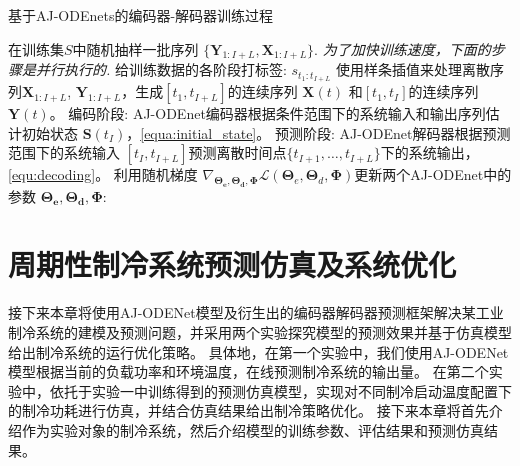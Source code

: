 \begin{algorithm*}[]
\caption{ 基于AJ-ODEnets的编码器-解码器训练过程 }
\label{alg:training}
\begin{algorithmic}[1]
\State  在训练集$S$中随机抽样一批序列 $\{\boldsymbol{Y}_{1:I+L}, {\boldsymbol {X}}_{1:I+L}\}$.
\State \text{//}\textit{为了加快训练速度，下面的步骤是并行执行的.}
\State 给训练数据的各阶段打标签: $s_{t_1:t_{I+L}}$
\State 使用样条插值来处理离散序列${\boldsymbol {X}}_{1:I+L}$, $\boldsymbol{Y}_{1:I+L}$，生成$[t_1, t_{I+L}]$的连续序列 $\boldsymbol X(t)$ 和$[t_1, t_{I}]$的连续序列 $\boldsymbol Y(t)$。
\State 编码阶段: AJ-ODEnet编码器根据条件范围下的系统输入和输出序列估计初始状态 $\boldsymbol{S}\left(t_{I}\right)$，\eqref{equa:initial_state}。
\State 预测阶段: AJ-ODEnet解码器根据预测范围下的系统输入 $[t_I, t_{I+L}]$预测离散时间点$\{t_{I+1}, \dots, t_{I+L}\}$下的系统输出，\eqref{equ:decoding}。
\State 利用随机梯度 $\nabla_{\boldsymbol{\Theta_{e}}, \boldsymbol{\Theta_{d}}, \boldsymbol \Phi}\mathcal{L}\left(\boldsymbol{\Theta}_{e}, \boldsymbol{\Theta}_{d}, \boldsymbol{\Phi}\right)$更新两个AJ-ODEnet中的参数 $\boldsymbol{\Theta_{e}}, \boldsymbol{\Theta_{d}}, \boldsymbol \Phi$:
\EndFor
\EndFor
\end{algorithmic}
\end{algorithm*}


\section{周期性制冷系统预测仿真及系统优化}
\label{sec:evalutaion}
接下来本章将使用AJ-ODENet模型及衍生出的编码器解码器预测框架解决某工业制冷系统的建模及预测问题，并采用两个实验探究模型的预测效果并基于仿真模型给出制冷系统的运行优化策略。
具体地，在第一个实验中，我们使用AJ-ODENet模型根据当前的负载功率和环境温度，在线预测制冷系统的输出量。
在第二个实验中，依托于实验一中训练得到的预测仿真模型，实现对不同制冷启动温度配置下的制冷功耗进行仿真，并结合仿真结果给出制冷策略优化。
接下来本章将首先介绍作为实验对象的制冷系统，然后介绍模型的训练参数、评估结果和预测仿真结果。


